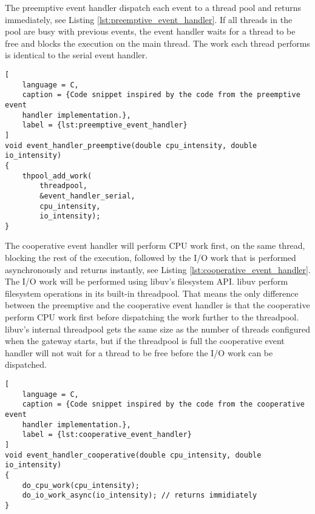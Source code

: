 The preemptive event handler dispatch each event to a thread pool and returns
immediately, see Listing \ref{lst:preemptive_event_handler}. If all threads in
the pool are busy with previous events, the event handler waits for a thread to
be free and blocks the execution on the main thread. The work each thread
performs is identical to the serial event handler.

\begin{lstlisting}[
    language = C,
    caption = {Code snippet inspired by the code from the preemptive event
    handler implementation.},
    label = {lst:preemptive_event_handler}
]
void event_handler_preemptive(double cpu_intensity, double io_intensity)
{
    thpool_add_work(
        threadpool,
        &event_handler_serial,
        cpu_intensity,
        io_intensity);
}
\end{lstlisting}

The cooperative event handler will perform CPU work first, on the same thread,
blocking the rest of the execution, followed by the I/O work that is performed
asynchronously and returns instantly, see Listing
\ref{lst:cooperative_event_handler}. The I/O work will be performed using
libuv's filesystem API. libuv perform filesystem operations in its built-in
threadpool. That means the only difference between the preemptive and the
cooperative event handler is that the cooperative perform CPU work first before
dispatching the work further to the threadpool. libuv's internal threadpool
gets the same size as the number of threads configured when the gateway starts,
but if the threadpool is full the cooperative event handler will not wait for a
thread to be free before the I/O work can be dispatched.

\begin{lstlisting}[
    language = C,
    caption = {Code snippet inspired by the code from the cooperative event
    handler implementation.},
    label = {lst:cooperative_event_handler}
]
void event_handler_cooperative(double cpu_intensity, double io_intensity)
{
    do_cpu_work(cpu_intensity);
    do_io_work_async(io_intensity); // returns immidiately
}
\end{lstlisting}


